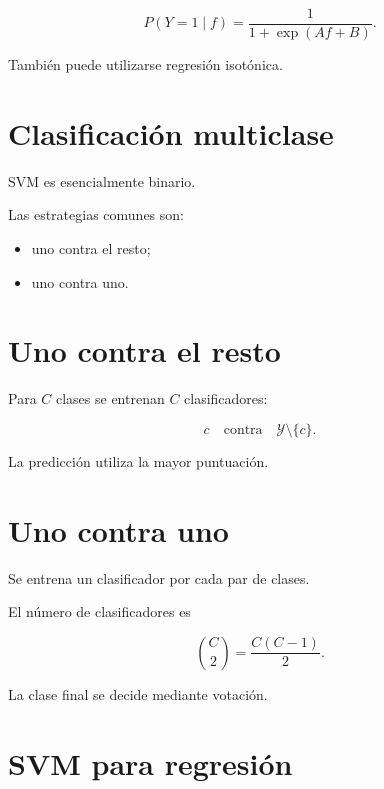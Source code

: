 \documentclass[
  spanish,
  10.5pt,
  letterpaper,
  DIV=11,
  numbers=noendperiod,
  oneside,
  open=any]{scrreprt}
\providecommand{\tightlist}{%
  \setlength{\itemsep}{0pt}\setlength{\parskip}{0pt}}
\theoremstyle{definition}
\theoremstyle{definition}
\theoremstyle{plain}
\theoremstyle{remark}
\begin{document}
\[
P(Y=1\mid f)
=
\frac{1}{
1+\exp(Af+B)
}.
\]

También puede utilizarse regresión isotónica.

\section*{Clasificación multiclase}\label{clasificaciuxf3n-multiclase-2}


SVM es esencialmente binario.

Las estrategias comunes son:

\begin{itemize}
\tightlist
\item
  uno contra el resto;
\item
  uno contra uno.
\end{itemize}

\section*{Uno contra el resto}\label{uno-contra-el-resto}


Para \(C\) clases se entrenan \(C\) clasificadores:

\[
c
\quad
\text{contra}
\quad
\mathcal{Y}\setminus\{c\}.
\]

La predicción utiliza la mayor puntuación.

\section*{Uno contra uno}\label{uno-contra-uno}


Se entrena un clasificador por cada par de clases.

El número de clasificadores es

\[
\binom{C}{2}
=
\frac{C(C-1)}{2}.
\]

La clase final se decide mediante votación.

\section*{SVM para regresión}\label{svm-para-regresiuxf3n}
\end{document}
